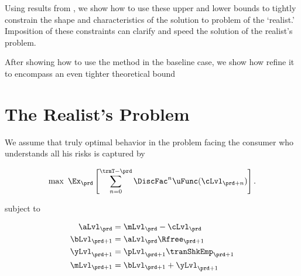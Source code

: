\documentclass[titlepage, headings=optiontotocandhead]{econark}
\newcommand{\texname}{cctwMoM} %
\renewcommand{\notinsubfile}[1]{}\renewcommand{\notinsubfile}[1]{#1}
\begin{document}
Using results from \cite{BufferStockTheory}, we show how to use these upper and lower bounds to tightly constrain the shape and characteristics of the solution to problem of the `realist.'
Imposition of these constraints can clarify and speed the solution of the realist's problem.

After showing how to use the method in the baseline case, we show how refine it to encompass an even tighter theoretical bound

\hypertarget{the-realists-problem}{}
\section{The Realist's Problem}

We assume that truly optimal behavior in the problem facing the consumer who understands all his risks is captured by

  \begin{equation}\label{eq:MaxProb}
    \max~\Ex_{\prd}\left[\sum_{n=0}^{\trmT-\prd}\DiscFac^{n} \uFunc(\cLvl_{\prd+n})\right].
  \end{equation}


subject to

  \begin{equation}\begin{gathered}\begin{aligned}
        \aLvl_{\prd}  & = \mLvl_{\prd}-\cLvl_{\prd} \label{DBCLevel}%
        \\  \bLvl_{\prd+1}  & = \aLvl_{\prd} \Rfree_{\prd+1}
        \\  \yLvl_{\prd+1}  & = \pLvl_{\prd+1}\tranShkEmp_{\prd+1}
        \\  \mLvl_{\prd+1}  & = \bLvl_{\prd+1} + \yLvl_{\prd+1} %
      \end{aligned}\end{gathered}\end{equation}
\end{document}
